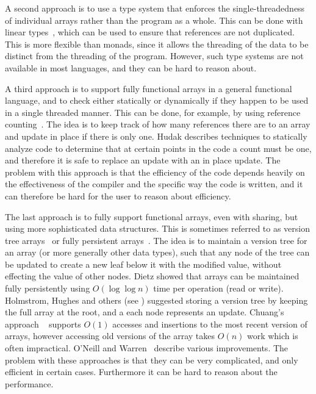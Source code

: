 A second approach is to use a type system that enforces the
single-threadedness of individual arrays rather than the program as a
whole.  This can be done with linear types~\cite{Girard87,Wadler90},
which can be used to ensure that references are not duplicated.  This
is more flexible than monads, since it allows the threading of the
data to be distinct from the threading of the program.  However, such
type systems are not available in most languages, and they can be hard
to reason about.   

A third approach is to support fully functional arrays in a general
functional language, and to check either statically or dynamically if they happen to be
used in a single threaded manner.  This can be done, for example, by
using reference counting~\cite{HB85,Hudak86}.  The idea is to keep
track of how many references there are to an array and update in place
if there is only one.  Hudak describes techniques to statically
analyze code to determine that at certain points in the code a count
must be one, and therefore it is safe to replace an update with an
in place update.  The problem with this approach is that the efficiency
of the code depends heavily on the effectiveness of the compiler and
the specific way the code is written, and it can therefore be hard for
the user to reason about efficiency.

The last approach is to fully support functional arrays, even with
sharing, but using more sophisticated data structures.  This is
sometimes referred to as version tree arrays~\cite{AHN88} or fully
persistent arrays~\cite{DSST89}. The idea is to maintain a version
tree for an array (or more generally other data types), such that any
node of the tree can be updated to create a new leaf below it with the
modified value, without effecting the value of other nodes.  Dietz
showed that arrays can be maintained fully persistently using
$O(\log\log n)$ time per operation (read or write).  Holmstrom, Hughes
and others (see \cite{AHN88}) suggested storing a version tree by
keeping the full array at the root, and a each node represents an
update.  Chuang's approach ~\cite{chuang} supports $O(1)$ accesses and
insertions to the most recent version of arrays, however accessing old
versions of the array takes $O(n)$ work which is often impractical.
O'Neill and Warren~\cite{oneill} describe various improvements.
The problem with these approaches is that they can be very complicated,
and only efficient in certain cases. Furthermore it can be hard to
reason about the performance.

